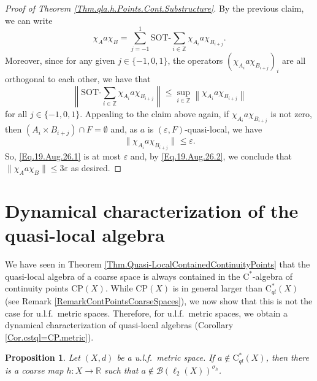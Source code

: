 \documentclass[11pt]{amsart}
\newcommand{\R}{\mathbb{R}}
\newcommand{\Z}{\mathbb{Z}}
\newcommand{\cB}{\mathcal{B}}
\newcommand{\eps}{\varepsilon}
\newcommand{\SOTh}{\mathrm{SOT}\text{-}}
\newcommand{\cstql}{\mathrm{C}^*_{\textit{ql}}}
\newcommand{\cstar}{$\mathrm{C}^*$}
\newcommand{\CP}{\mathrm{CP}}
\numberwithin{equation}{section}
\newtheorem{proposition}[theorem]{Proposition}
\theoremstyle{definition}
\theoremstyle{remark}
\begin{document}
\begin{proof}[Proof of Theorem \ref{Thm.qla.h.Points.Cont.Substructure}]
By the previous claim, we can write
\begin{equation}\label{Eq.19.Aug.26.2}\chi_Aa\chi_B=\sum_{j=-1}^1\SOTh\sum_{i\in\Z}\chi_{A_i}a\chi_{B_{i+j}}.\end{equation}
Moreover, since for any given $j\in \{-1,0,1\}$, the operators $(\chi_{A_i}a\chi_{B_{i+j}})_i$ are all orthogonal to each other, we have that
\begin{equation}\label{Eq.19.Aug.26.1}\left\|\SOTh\sum_{i\in\Z}\chi_{A_i}a\chi_{B_{i+j}}\right\|\leq \sup_{i\in\Z}\left\|\chi_{A_i}a\chi_{B_{i+j}}\right\|
\end{equation}
for all $j\in \{-1,0,1\}$. Appealing to the claim above again, if $\chi_{A_i}a\chi_{B_{i+j}}$ is not zero, then $(A_i\times B_{i+j})\cap F=\emptyset$ and, as $a$ is $(\eps,F)$-quasi-local, we have
\[\|\chi_{A_i}a\chi_{B_{i+j}} \|\leq \eps.\]
So, \eqref{Eq.19.Aug.26.1} is at most $\eps$ and, by \eqref{Eq.19.Aug.26.2}, we conclude that $\|\chi_Aa\chi_B\|\leq 3\eps$ as desired.
\end{proof}





\section{Dynamical characterization of the quasi-local algebra}

We have seen in Theorem \ref{Thm.Quasi-LocalContainedContinuityPoints} that the quasi-local algebra of a  coarse space is always contained in the \cstar-algebra of continuity points $\CP(X)$. While $\CP(X)$ is in general larger than $\cstql(X)$ (see Remark \ref{RemarkContPointsCoarseSpaces}), we now show that this is not the case for u.l.f.\ metric spaces. Therefore, for u.l.f.\ metric spaces, we obtain a dynamical characterization of quasi-local algebras (Corollary \ref{Cor.cstql=CP.metric}).


\begin{proposition}\label{PropNotInQLThereisCoarseNotInCPFlow}
    Let $(X,d)$ be a u.l.f.\ metric space. If $a\not\in \cstql(X)$, then there is a coarse map $h\colon X\to \R$ such that $a\not\in \cB(\ell_2(X))^{ \sigma_h}$.
    \end{proposition}
\end{document}
